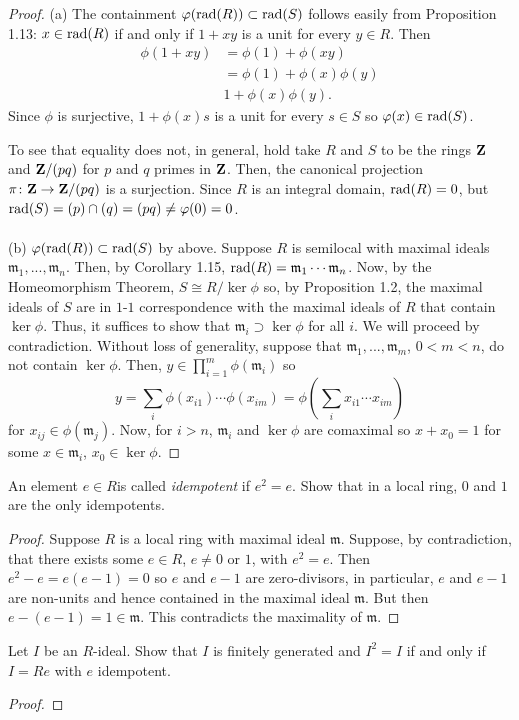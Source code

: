 \begin{proof}
(a) The containment $\varphi(\mathrm{rad}(R))\subset\mathrm{rad}(S)$ follows easily
from Proposition 1.13: $x\in\mathrm{rad}(R)$ if and only if $1+xy$ is a
unit for every $y\in R$. Then
\begin{align*}
\phi(1+xy)&=\phi(1)+\phi(xy)\\
             &=\phi(1)+\phi(x)\phi(y)\\
             &1+\phi(x)\phi(y).
\end{align*}
Since $\phi$ is surjective, $1+\phi(x)s$ is a unit for every
$s\in S$ so $\varphi(x)\in\mathrm{rad}(S)$.


To see that equality does not, in general, hold take $R$ and $S$
to be the rings $\mathbf{Z}$ and $\mathbf{Z}/(pq)$ for $p$ and $q$ primes in
$\mathbf{Z}$. Then, the canonical projection $\pi\colon\mathbf{Z}\to\mathbf{Z}/(pq)$
is a surjection. Since $R$ is an integral domain,
$\mathrm{rad}(R)=0$, but $\mathrm{rad}(S)=(p)\cap (q)=(pq)\neq\varphi(0)=0$.
\\\\
(b) $\varphi(\mathrm{rad}(R))\subset\mathrm{rad}(S)$ by above. Suppose $R$ is
semilocal with maximal ideals
$\mathfrak{m}_1,...,\mathfrak{m}_n$. Then, by Corollary 1.15,
$\mathrm{rad}(R)=\mathfrak{m}_1\cdots\mathfrak{m}_n$. Now, by the
Homeomorphism Theorem, $S\cong R/\ker\phi$ so, by Proposition
1.2, the maximal ideals of $S$ are in $1$-$1$ correspondence with
the maximal ideals of $R$ that contain $\ker\phi$. Thus, it
suffices to show that $\mathfrak{m}_i\supset\ker\phi$ for all
$i$. We will proceed by contradiction. Without loss of
generality, suppose that $\mathfrak{m}_1,...,\mathfrak{m}_m$,
$0<m<n$, do not contain $\ker\phi$. Then,
$y\in\prod_{i=1}^m\phi(\mathfrak{m}_i)$ so
\[
y
=
\sum_i\phi(x_{i1})\cdots\phi(x_{im})
=
\phi\left(\sum_i x_{i1}\cdots x_{im}\right)
\]
for $x_{ij}\in\phi(\mathfrak{m}_j)$. Now, for $i>n$,
$\mathfrak{m}_i$ and $\ker\phi$ are comaximal so $x+x_0=1$ for
some $x\in\mathfrak{m}_i$, $x_0\in\ker\phi$.
\end{proof}
\newpage
\begin{problem}
An element $e\in R$is called \emph{idempotent} if $e^2=e$. Show
that in a local ring, $0$ and $1$ are the only idempotents.
\end{problem}
\begin{proof}
Suppose $R$ is a local ring with maximal ideal
$\mathfrak{m}$. Suppose, by contradiction, that there exists some
$e\in R$, $e\neq 0$ or $1$, with $e^2=e$. Then $e^2-e=e(e-1)=0$
so $e$ and $e-1$ are zero-divisors, in particular, $e$ and $e-1$
are non-units and hence contained in the maximal ideal
$\mathfrak{m}$. But then $e-(e-1)=1\in\mathfrak{m}$. This
contradicts the maximality of $\mathfrak{m}$.
\end{proof}
\newpage
\begin{problem}
Let $I$ be an $R$-ideal. Show that $I$ is finitely generated and
$I^2=I$ if and only if $I=Re$ with $e$ idempotent.
\end{problem}
\begin{proof}

\end{proof}

